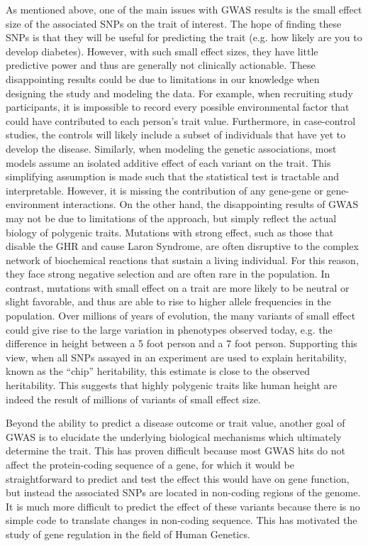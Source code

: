 As mentioned above, one of the main issues with GWAS results is the
small effect size of the associated SNPs on the trait of interest. The
hope of finding these SNPs is that they will be useful for predicting
the trait (e.g. how likely are you to develop diabetes). However, with
such small effect sizes, they have little predictive power and thus
are generally not clinically actionable. These disappointing results
could be due to limitations in our knowledge when designing the study
and modeling the data. For example, when recruiting study
participants, it is impossible to record every possible environmental
factor that could have contributed to each person’s trait
value. Furthermore, in case-control studies, the controls will likely
include a subset of individuals that have yet to develop the
disease. Similarly, when modeling the genetic associations, most
models assume an isolated additive effect of each variant on the
trait. This simplifying assumption is made such that the statistical
test is tractable and interpretable. However, it is missing the
contribution of any gene-gene or gene-environment interactions. On the
other hand, the disappointing results of GWAS may not be due to
limitations of the approach, but simply reflect the actual biology of
polygenic traits. Mutations with strong effect, such as those that
disable the GHR and cause Laron Syndrome, are often disruptive to the
complex network of biochemical reactions that sustain a living
individual. For this reason, they face strong negative selection and
are often rare in the population. In contrast, mutations with small
effect on a trait are more likely to be neutral or slight favorable,
and thus are able to rise to higher allele frequencies in the
population. Over millions of years of evolution, the many variants of
small effect could give rise to the large variation in phenotypes
observed today, e.g. the difference in height between a 5 foot person
and a 7 foot person. Supporting this view, when all SNPs assayed in an
experiment are used to explain heritability, known as the “chip”
heritability, this estimate is close to the observed
heritability. This suggests that highly polygenic traits like human
height are indeed the result of millions of variants of small effect
size.

Beyond the ability to predict a disease outcome or trait value,
another goal of GWAS is to elucidate the underlying biological
mechanisms which ultimately determine the trait. This has proven
difficult because most GWAS hits do not affect the protein-coding
sequence of a gene, for which it would be straightforward to predict
and test the effect this would have on gene function, but instead the
associated SNPs are located in non-coding regions of the genome. It is
much more difficult to predict the effect of these variants because
there is no simple code to translate changes in non-coding
sequence. This has motivated the study of gene regulation in the field
of Human Genetics.


